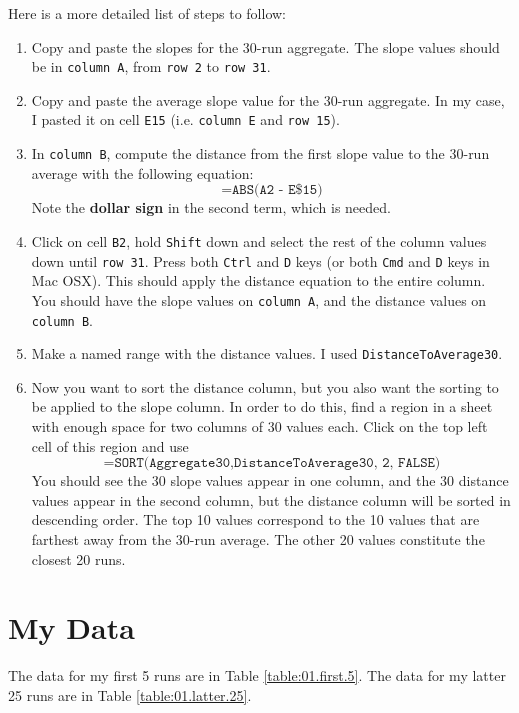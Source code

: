 Here is a more detailed list of steps to follow:
\begin{enumerate}
    \item Copy and paste the slopes for the 30-run aggregate. The slope values should be in \texttt{column A}, from \texttt{row 2} to \texttt{row 31}.
    \item Copy and paste the average slope value for the 30-run aggregate. In my case, I pasted it on cell \texttt{E15} (i.e. \texttt{column E} and \texttt{row 15}).
    \item In \texttt{column B}, compute the distance from the first slope value to the 30-run average with the following equation:
    \begin{equation}
        \texttt{=ABS(A2 - E\$15)}
    \end{equation}
    Note the \textbf{dollar sign} in the second term, which is needed.
    \item Click on cell \texttt{B2}, hold \texttt{Shift} down and select the rest of the column values down until \texttt{row 31}. Press both \texttt{Ctrl} and \texttt{D} keys (or both \texttt{Cmd} and \texttt{D} keys in Mac OSX). This should apply the distance equation to the entire column. You should have the slope values on \texttt{column A}, and the distance values on \texttt{column B}.
    \item Make a named range with the distance values. I used \texttt{DistanceToAverage30}.
    \item Now you want to sort the distance column, but you also want the sorting to be applied to the slope column. In order to do this, find a region in a sheet with enough space for two columns of 30 values each. Click on the top left cell of this region and use
    \begin{equation}
        \texttt{=SORT({Aggregate30,DistanceToAverage30}, 2, FALSE)}
    \end{equation}
    You should see the 30 slope values appear in one column, and the 30 distance values appear in the second column, but the distance column will be sorted in descending order. The top 10 values correspond to the 10 values that are farthest away from the 30-run average. The other 20 values constitute the closest 20 runs.
\end{enumerate}
%
\section{My Data}
%
The data for my first 5 runs are in Table \ref{table:01.first.5}. The data for my latter 25 runs are in Table \ref{table:01.latter.25}.

